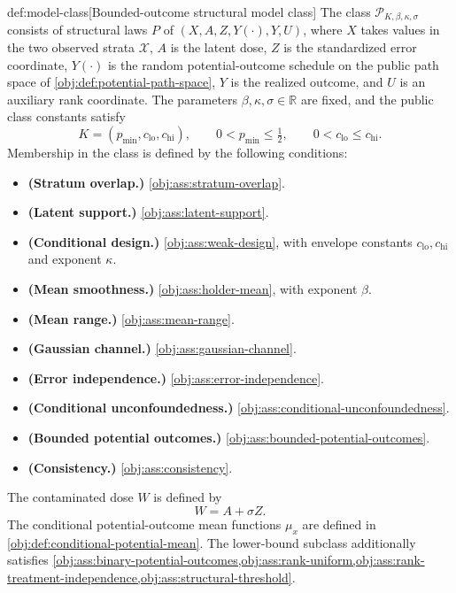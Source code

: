 \begin{definitionv}{def:model-class}[Bounded-outcome structural model class]
The class \(\mathcal P_{K,\beta,\kappa,\sigma}\) consists of structural laws \(P\) of \((X,A,Z,Y(\cdot),Y,U)\), where \(X\) takes values in the two observed strata \(\mathcal X\), \(A\) is the latent dose, \(Z\) is the standardized error coordinate, \(Y(\cdot)\) is the random potential-outcome schedule on the public path space of \cref{obj:def:potential-path-space}, \(Y\) is the realized outcome, and \(U\) is an auxiliary rank coordinate. The parameters \(\beta,\kappa,\sigma\in\mathbb R\) are fixed, and the public class constants satisfy
\[
K=(p_{\min},c_{\mathrm{lo}},c_{\mathrm{hi}}),
\qquad
0<p_{\min}\le \tfrac12,
\qquad
0<c_{\mathrm{lo}}\le c_{\mathrm{hi}}.
\]
Membership in the class is defined by the following conditions:
\begin{itemize}
\item \textbf{(Stratum overlap.)} \cref{obj:ass:stratum-overlap}.
\item \textbf{(Latent support.)} \cref{obj:ass:latent-support}.
\item \textbf{(Conditional design.)} \cref{obj:ass:weak-design}, with envelope constants \(c_{\mathrm{lo}},c_{\mathrm{hi}}\) and exponent \(\kappa\).
\item \textbf{(Mean smoothness.)} \cref{obj:ass:holder-mean}, with exponent \(\beta\).
\item \textbf{(Mean range.)} \cref{obj:ass:mean-range}.
\item \textbf{(Gaussian channel.)} \cref{obj:ass:gaussian-channel}.
\item \textbf{(Error independence.)} \cref{obj:ass:error-independence}.
\item \textbf{(Conditional unconfoundedness.)} \cref{obj:ass:conditional-unconfoundedness}.
\item \textbf{(Bounded potential outcomes.)} \cref{obj:ass:bounded-potential-outcomes}.
\item \textbf{(Consistency.)} \cref{obj:ass:consistency}.
\end{itemize}
The contaminated dose \(W\) is defined by
\[
W=A+\sigma Z.
\]
The conditional potential-outcome mean functions \(\mu_x\) are defined in \cref{obj:def:conditional-potential-mean}. The lower-bound subclass additionally satisfies \cref{obj:ass:binary-potential-outcomes,obj:ass:rank-uniform,obj:ass:rank-treatment-independence,obj:ass:structural-threshold}.
\end{definitionv}

